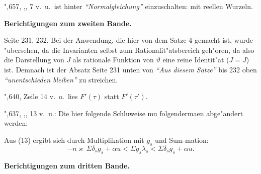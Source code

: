 \documentclass[12pt,a4paper]{article}
\begin{document}
\smallskip

\noindent\hspace*{2em}",\hspace{1.8em}657, \hspace{2.5em},,\hspace{0.2em} \hspace{0.8em}7 v.~u.\ ist hinter \textit{``Normalgleichung''} einzuschalten: mit reellen Wurzeln.

\bigskip
\begin{center}
\large\textbf{Berichtigungen zum zweiten Bande.}
\end{center}

\medskip

\noindent
Seite 231, 232. Bei der Anwendung, die hier von dem Satze 4 gemacht ist, wurde "ubersehen, da{\/} die Invarianten selbst zum Rationalit"atsbereich geh"oren, da{\/} also die Darstellung von $J$ als rationale Funktion von $\vartheta$ eine reine Identit"at ($J=J$) ist. Demnach ist der Absatz Seite 231 unten von \textit{``Aus diesem Satze''} bis 232 oben \textit{``unentschieden bleiben''} zu streichen.

\smallskip

\noindent\hspace*{2em}",\hspace{1.8em}640, Zeile 14 v.~o.\ lies $F'(\tau)$ statt $F'(\tau')$.

\smallskip

\noindent\hspace*{2em}",\hspace{1.8em}637, \hspace{2.5em},,\hspace{0.2em} \hspace{0.2em}13 v.~u.: Die hier folgende Schlu{\/}weise mu{\/} folgenderma{\/}en abge"andert werden:

\smallskip

\noindent\hspace*{6em}Aus (13) ergibt sich durch Multiplikation mit $g_s$ und Sum{-}mation:
\[-n\varkappa\,\Sigma\delta_s g_s + \alpha u < \Sigma g_s\lambda_s < \Sigma\delta_s g_s + \alpha u.\]

\newpage
\setcounter{page}{733}

\begin{center}
\large\textbf{Berichtigungen zum dritten Bande.}
\end{center}

\medskip
\end{document}
